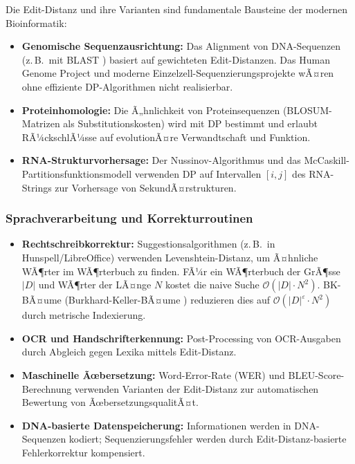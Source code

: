 ﻿\documentclass[a4paper,12pt]{article}
\theoremstyle{definition}
\begin{document}
Die Edit-Distanz und ihre Varianten sind fundamentale Bausteine der modernen
Bioinformatik:
\begin{itemize}
    \item \textbf{Genomische Sequenzausrichtung:} Das Alignment von DNA-Sequenzen
          (z.\,B.\ mit BLAST \cite{altschul1990}) basiert auf gewichteten Edit-Distanzen.
          Das Human Genome Project und moderne Einzelzell-Sequenzierungsprojekte
          wÃ¤ren ohne effiziente DP-Algorithmen nicht realisierbar.
    \item \textbf{Proteinhomologie:} Die Ã„hnlichkeit von Proteinsequenzen
          (BLOSUM-Matrizen als Substitutionskosten) wird mit DP bestimmt und
          erlaubt RÃ¼ckschlÃ¼sse auf evolutionÃ¤re Verwandtschaft und Funktion.
    \item \textbf{RNA-Strukturvorhersage:} Der Nussinov-Algorithmus und das
          McCaskill-Partitionsfunktionsmodell verwenden DP auf Intervallen
          $[i, j]$ des RNA-Strings zur Vorhersage von SekundÃ¤rstrukturen.
\end{itemize}

\subsubsection{Sprachverarbeitung und Korrekturroutinen}

\begin{itemize}
    \item \textbf{Rechtschreibkorrektur:} Suggestionsalgorithmen (z.\,B.\ in
          Hunspell/LibreOffice) verwenden Levenshtein-Distanz, um Ã¤hnliche
          WÃ¶rter im WÃ¶rterbuch zu finden. FÃ¼r ein WÃ¶rterbuch der GrÃ¶sse $|D|$
          und WÃ¶rter der LÃ¤nge $N$ kostet die naive Suche $\mathcal{O}(|D| \cdot N^2)$.
          BK-BÃ¤ume (Burkhard-Keller-BÃ¤ume \cite{burkhard1973}) reduzieren dies
          auf $\mathcal{O}(|D|^\varepsilon \cdot N^2)$ durch metrische Indexierung.
    \item \textbf{OCR und Handschrifterkennung:} Post-Processing von OCR-Ausgaben
          durch Abgleich gegen Lexika mittels Edit-Distanz.
    \item \textbf{Maschinelle Ãœbersetzung:} Word-Error-Rate (WER) und
          BLEU-Score-Berechnung verwenden Varianten der Edit-Distanz zur
          automatischen Bewertung von ÃœbersetzungsqualitÃ¤t.
    \item \textbf{DNA-basierte Datenspeicherung:} Informationen werden in
          DNA-Sequenzen kodiert; Sequenzierungsfehler werden durch
          Edit-Distanz-basierte Fehlerkorrektur kompensiert.
\end{itemize}
\end{document}
